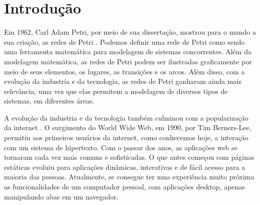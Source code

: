 \documentclass[
	12pt,				%
	openright,			%
	oneside,			%
	a4paper,			%
	english,			%
	brazil				%
	]{abntex2}
\begin{document}

\tableofcontents*
\cleardoublepage


\makeatletter
{}
\makeatother




\textual


\chapter[Introdução]{Introdução}

Em 1962, Carl Adam Petri, por meio de sua dissertação, mostrou para o mundo a sua criação, as redes de Petri \cite{petri1962kommunikation}. Podemos definir uma rede de Petri como sendo uma ferramenta matemática para modelagem de sistemas concorrentes. Além da modelagem matemática, as redes de Petri podem ser ilustradas graficamente por meio de seus elementos, os lugares, as transições e os arcos. Além disso, com a evolução da industria e da tecnologia, as redes de Petri ganharam ainda mais relevância, uma vez que elas permitem a modelagem de diversos tipos de sistemas, em diferentes áreas. 

A evolução da industria e da tecnologia também culminou com a popularização da internet \cite{lins2013evoluccao}. O surgimento do World Wide Web, em 1990, por Tim Berners-Lee, permitiu aos primeiros usuários da internet, como conhecemos hoje, a interação com um sistema de hipertexto. Com o passar dos anos, as aplicações web se tornaram cada vez mais comuns e sofisticadas. O que antes começou com páginas estáticas evoluiu para aplicações dinâmicas, interativas e de fácil acesso para a maioria das pessoas. Atualmente, se consegue ter uma experiência muito próxima as funcionalidades de um computador pessoal, com aplicações desktop, apenas manipulando abas em um navegador.
\end{document}

